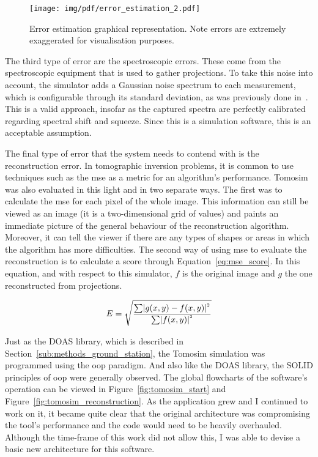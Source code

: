 \begin{figure}[htpb]
    \centering
    \texttt{[image: img/pdf/error\_estimation\_2.pdf]}
    \caption{Error estimation graphical representation. Note errors are
    extremely exaggerated for visualisation purposes.}
    \label{fig:geometric_error_calculation}
\end{figure}

The third type of error are the spectroscopic errors. These come from
the spectroscopic equipment that is used to gather projections. To take
this noise into account, the simulator adds a Gaussian noise spectrum to
each measurement, which is configurable through its standard deviation,
as was previously done in~\cite{Stutz1996}. This is a valid approach,
insofar as the captured spectra are perfectly calibrated regarding
spectral shift and squeeze. Since this is a simulation software, this is
an acceptable assumption.

The final type of error that the system needs to contend with is the
reconstruction error. In tomographic inversion problems, it is common to
use techniques such as the \gls{mse} as a metric for an algorithm's
performance. Tomosim was also evaluated in this light and in two
separate ways. The first was to calculate the \gls{mse} for each pixel of the
whole image. This information can still be viewed as an image (it is a
two-dimensional grid of values) and paints an immediate picture of the
general behaviour of the reconstruction algorithm. Moreover, it can tell
the viewer if there are any types of shapes or areas in which the
algorithm has more difficulties. The second way of using \gls{mse} to
evaluate the reconstruction is to calculate a score through
Equation~\ref{eq:mse_score}. In this equation, and with respect to this
simulator, $f$ is the original image and $g$ the one reconstructed from
projections.

\begin{equation}
    \centering
    \label{eq:mse_score}
    E = \sqrt{\frac{\sum\lvert g(x,y) - f(x,y)
    \lvert^{^{2}}}{\sum\lvert f(x,y) \lvert ^{^{2}}}}
\end{equation}


Just as the \gls{DOAS} library, which is described in
Section~\ref{sub:methods_ground_station}, the Tomosim simulation was
programmed using the \gls{oop} paradigm. And also like the \gls{DOAS}
library, the SOLID principles of \gls{oop} were generally observed. The
global flowcharts of the software's operation can be viewed in
Figure~\ref{fig:tomosim_start} and
Figure~\ref{fig:tomosim_reconstruction}. As the application grew and I
continued to work on it, it became quite clear that the original
architecture was compromising the tool's performance and the code would
need to be heavily overhauled. Although the time-frame of this work did
not allow this, I was able to devise a basic new architecture for this
software. 

